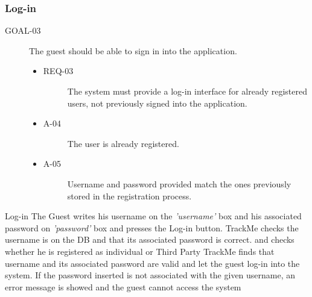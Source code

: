 \documentclass[a4paper]{article}
\newcommand{\requirement}{\ding{229}}%
\begin{document}
        
        \subsubsection{Log-in}
        
        
        \begin{description}
        	\item[GOAL-03] The guest should be able to sign in into the application.
            	\begin{itemize}
            	    \item[\requirement]
                	\begin{description}
                	\item[REQ-03] The system must provide a log-in interface for already registered users, not previously signed into the application.
                	\end{description}
                	\item
                	\begin{description}
                	\item[A-04] The user is already registered.
                	\end{description}
                	\item
                	\begin{description}
                	\item[A-05] Username and password provided match the ones previously stored in the registration process.
                	\end{description}
                	\end{itemize}
        \end{description}
        
        
        \begin{usecase}{Log-in}
              {The Guest writes his username on the \textit{'username'} box and his associated password on \textit{'password'} box and presses the Log-in button.}
              {TrackMe checks the username is on the DB and that its associated password is correct. and checks whether he is  registered as individual or Third Party}
              {TrackMe finds that username and its associated password are valid and let the guest log-in into the system.}
        {If the password inserted is not associated with the given username, an error message is showed and the guest cannot access the system}
        \end{usecase}
        
\end{document}
